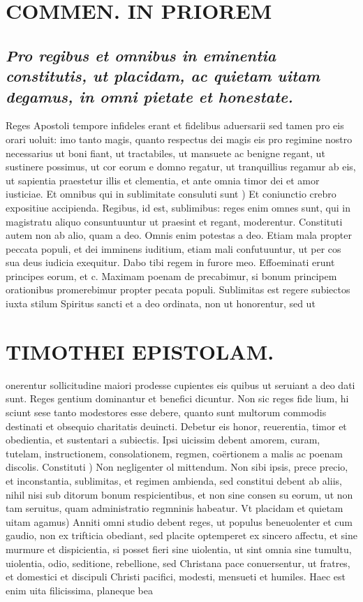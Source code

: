 \documentclass{article}
\begin{document}
\begin{pages}
\section*{COMMEN. IN PRIOREM }
\marginpar{[ p.44 ]}
{}
\subsection*{\textit{Pro regibus et omnibus in eminentia constitutis, ut placidam, ac quietam uitam degamus, in omni pietate et honestate. }}\pstart Reges Apostoli tempore infideles erant et fidelibus aduersarii sed tamen pro eis orari uoluit: imo tanto magis, quanto respectus dei magis eis pro regimine nostro necessarius ut boni fiant, ut tractabiles, ut mansuete ac benigne regant, ut sustinere possimus, ut cor eorum e domno regatur, ut tranquillius regamur ab eis, ut sapientia praestetur illis et clementia, et ante omnia timor dei et amor iusticiae.  \pend\pstart Et omnibus qui in sublimitate consuluti sunt ) Et coniunctio crebro expositiue accipienda. Regibus, id est, sublimibus: reges enim omnes sunt, qui in magistratu aliquo consuntuuntur ut praesint et regant, moderentur. Constituti autem non ab alio, quam a deo. Omnis enim potestas a deo. Etiam mala propter peccata populi, et dei imminens iuditium, etiam mali confutuuntur, ut per cos sua deus iudicia exequitur. Dabo tibi regem in furore meo. Effoeminati erunt principes eorum, et c. Maximam poenam de precabimur, si bonum principem orationibus promerebimur propter pecata populi.  \pend\pstart Sublimitas est regere subiectos iuxta stilum Spiritus sancti et a deo ordinata, non ut honorentur, sed ut  \pend
\section*{TIMOTHEI EPISTOLAM. }
\marginpar{[ p.45 ]}\pstart onerentur sollicitudine maiori prodesse cupientes eis quibus ut seruiant a deo dati sunt. Reges gentium dominantur et benefici dicuntur. Non sic reges fide lium, hi sciunt sese tanto modestores esse debere, quanto sunt multorum commodis destinati et obsequio charitatis deuincti. Debetur eis honor, reuerentia, timor et obedientia, et sustentari a subiectis. Ipsi uicissim debent amorem, curam, tutelam, instructionem, consolationem, regmen, coërtionem a malis ac poenam discolis.  \pend\pstart Constituti ) Non negligenter ol mittendum. Non sibi ipsis, prece precio, et inconstantia, sublimitas, et regimen ambienda, sed constitui debent ab aliis, nihil nisi sub ditorum bonum respicientibus, et non sine consen su eorum, ut non tam seruitus, quam administratio regmninis habeatur.  \pend\pstart Vt placidam et quietam uitam agamus) Anniti omni studio debent reges, ut populus beneuolenter et cum gaudio, non ex trifticia obediant, sed placite optemperet ex sincero affectu, et sine murmure et dispicientia, si posset fieri sine uiolentia, ut sint omnia sine tumultu, uiolentia, odio, seditione, rebellione, sed Christana pace conuersentur, ut fratres, et domestici et discipuli Christi pacifici, modesti, mensueti et humiles. Haec est enim uita filicissima, planeque bea\pend

\end{pages}
\end{document}

